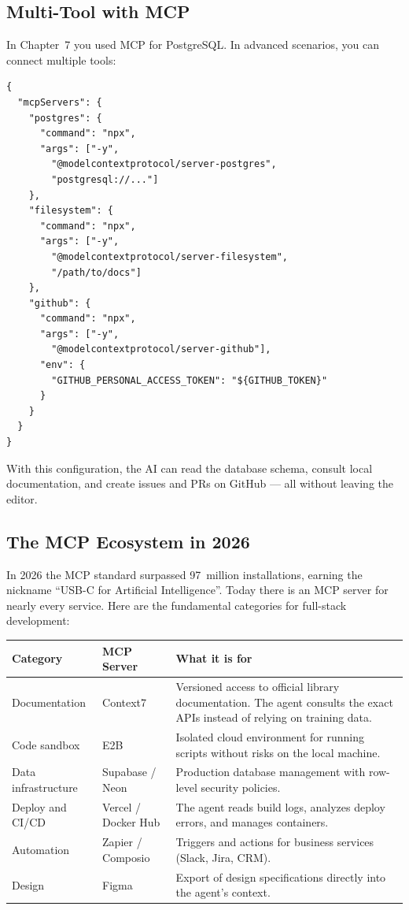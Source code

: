 \subsection{Multi-Tool with MCP}

In Chapter~7 you used MCP for PostgreSQL. In advanced scenarios, you can connect multiple tools:

\begin{lstlisting}[language={},title={Multi-tool MCP configuration}]
{
  "mcpServers": {
    "postgres": {
      "command": "npx",
      "args": ["-y",
        "@modelcontextprotocol/server-postgres",
        "postgresql://..."]
    },
    "filesystem": {
      "command": "npx",
      "args": ["-y",
        "@modelcontextprotocol/server-filesystem",
        "/path/to/docs"]
    },
    "github": {
      "command": "npx",
      "args": ["-y",
        "@modelcontextprotocol/server-github"],
      "env": {
        "GITHUB_PERSONAL_ACCESS_TOKEN": "${GITHUB_TOKEN}"
      }
    }
  }
}
\end{lstlisting}

With this configuration, the AI can read the database schema, consult local documentation, and create issues and PRs on GitHub --- all without leaving the editor.

\subsection{The MCP Ecosystem in 2026}

In 2026 the MCP standard surpassed 97~million installations, earning the nickname ``USB-C for Artificial Intelligence''. Today there is an MCP server for nearly every service. Here are the fundamental categories for full-stack development:

\begin{center}
\begin{small}
\begin{tabularx}{\textwidth}{l l X}
\toprule
\textbf{Category} & \textbf{MCP Server} & \textbf{What it is for} \\
\midrule
Documentation & Context7 & Versioned access to official library documentation. The agent consults the exact APIs instead of relying on training data. \\
Code sandbox & E2B & Isolated cloud environment for running scripts without risks on the local machine. \\
Data infrastructure & Supabase / Neon & Production database management with row-level security policies. \\
Deploy and CI/CD & Vercel / Docker Hub & The agent reads build logs, analyzes deploy errors, and manages containers. \\
Automation & Zapier / Composio & Triggers and actions for business services (Slack, Jira, CRM). \\
Design & Figma & Export of design specifications directly into the agent's context. \\
\bottomrule
\end{tabularx}
\end{small}
\end{center}

